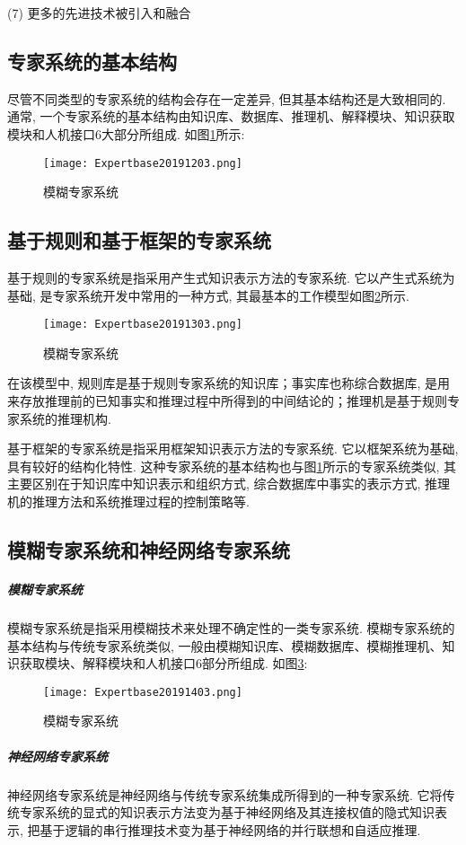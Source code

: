     (7) 更多的先进技术被引入和融合

\subsection{专家系统的基本结构}
尽管不同类型的专家系统的结构会存在一定差异, 但其基本结构还是大致相同的. 通常, 一个专家系统的基本结构由知识库、数据库、推理机、解释模块、知识获取模块和人机接口6大部分所组成. 如图\ref{Expertbase20191203}所示:
\begin{figure}[H]
\centering
\texttt{[image: Expertbase20191203.png]}
\caption{模糊专家系统}
\label{Expertbase20191203}
\end{figure}
\subsection{基于规则和基于框架的专家系统}
基于规则的专家系统是指采用产生式知识表示方法的专家系统. 它以产生式系统为基础, 是专家系统开发中常用的一种方式, 其最基本的工作模型如图\ref{Expertbase20191303}所示.
\begin{figure}[H]
\centering
\texttt{[image: Expertbase20191303.png]}
\caption{模糊专家系统}
\label{Expertbase20191303}
\end{figure}
在该模型中, 规则库是基于规则专家系统的知识库；事实库也称综合数据库, 是用来存放推理前的已知事实和推理过程中所得到的中间结论的；推理机是基于规则专家系统的推理机构.

基于框架的专家系统是指采用框架知识表示方法的专家系统. 它以框架系统为基础, 具有较好的结构化特性. 这种专家系统的基本结构也与图\ref{Expertbase20191203}所示的专家系统类似, 其主要区别在于知识库中知识表示和组织方式, 综合数据库中事实的表示方式, 推理机的推理方法和系统推理过程的控制策略等.
\subsection{模糊专家系统和神经网络专家系统}
\subparagraph{模糊专家系统}
模糊专家系统是指采用模糊技术来处理不确定性的一类专家系统. 模糊专家系统的基本结构与传统专家系统类似, 一般由模糊知识库、模糊数据库、模糊推理机、知识获取模块、解释模块和人机接口6部分所组成. 如图\ref{Expertbase20191403}:
\begin{figure}[H]
\centering
\texttt{[image: Expertbase20191403.png]}
\caption{模糊专家系统}
\label{Expertbase20191403}
\end{figure}
\subparagraph{神经网络专家系统}
神经网络专家系统是神经网络与传统专家系统集成所得到的一种专家系统. 它将传统专家系统的显式的知识表示方法变为基于神经网络及其连接权值的隐式知识表示, 把基于逻辑的串行推理技术变为基于神经网络的并行联想和自适应推理.

